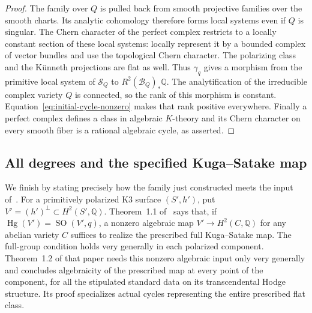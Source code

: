 \documentclass[11pt]{article}
\numberwithin{equation}{section}
\theoremstyle{definition}
\theoremstyle{remark}
\begin{document}
\begin{proof}
The family over $Q$ is pulled back from smooth projective families
over the smooth charts. Its analytic cohomology therefore forms
local systems even if $Q$ is singular. The Chern character of the
perfect complex restricts to a locally constant section of these
local systems: locally represent it by a bounded complex of vector
bundles and use the topological Chern character. The polarizing
class and the K\"unneth projections are flat as well. Thus
$\gamma_q$ gives a morphism from the primitive local system of
$\mathcal S_Q$ to $R^2(\mathcal B_Q)_*\mathbb Q$. The analytification
of the irreducible complex variety $Q$ is connected, so the rank
of this morphism is constant. Equation~\eqref{eq:initial-cycle-nonzero}
makes that rank positive everywhere. Finally a perfect complex
defines a class in algebraic $K$-theory and its Chern character
on every smooth fiber is a rational algebraic cycle, as asserted.
\end{proof}

\subsection{All degrees and the specified Kuga--Satake map}

We finish by stating precisely how the family just constructed meets
the input of~\cite{R}. For a primitively polarized K3 surface
$(S',h')$, put $V'=(h')^\perp\subset H^2(S',\mathbb Q)$.
Theorem~1.1 of~\cite{R} says that, if
$\operatorname{Hg}(V')=\operatorname{SO}(V',q)$, a nonzero algebraic map
$V'\to H^2(C,\mathbb Q)$ for any abelian variety $C$ suffices to realize
the prescribed full Kuga--Satake map. The full-group condition
holds very generally in each polarized component.
Theorem~1.2 of that paper needs this nonzero algebraic input only
very generally and concludes algebraicity of the prescribed map
at every point of the component, for all the stipulated standard
data on its transcendental Hodge structure. Its proof specializes
actual cycles representing the entire prescribed flat class.
\end{document}
